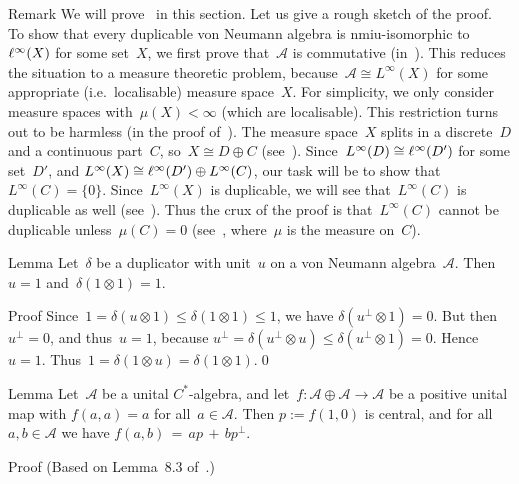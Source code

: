 \documentclass[a]{subfiles}
\begin{document}
\begin{parsec}
\begin{point}{Remark}
\label{sec:characterisation-dup-vna}
We will prove~ in this section.
Let us give
a rough sketch of the proof.
To show that every duplicable von Neumann algebra
is nmiu-isomorphic to~$\ell^\infty(X)$ for some set~$X$,
we first prove that~$\mathscr{A}$
is commutative (in~).
This reduces the situation
to a measure theoretic problem,
because~$\mathscr{A} \cong L^\infty(X)$
for some appropriate (i.e.~localisable) measure space~$X$.
For simplicity,
we only consider
measure spaces with~$\mu(X)<\infty$
(which are localisable).
This restriction turns out to be harmless
(in the proof of~).
The measure space~$X$ splits
in a discrete~$D$ and a continuous part~$C$,
so~$X\cong D\oplus C$
(see~).
Since~$L^\infty(D)\cong \ell^\infty(D')$
for some set~$D'$,
and $L^\infty(X)\cong \ell^\infty(D')\oplus L^\infty(C)$,
our task will be  to show that~$L^\infty(C)=\{0\}$.
Since~$L^\infty(X)$ is duplicable,
we will see that~$L^\infty(C)$ is duplicable as well
(see~).
Thus the crux of the proof is that~$L^\infty(C)$
cannot be duplicable unless~$\mu(C)=0$
(see~,
where~$\mu$ is the measure on~$C$).
\end{point}
\begin{point}{Lemma}%
\label{lem:unit-duplicator}
Let~$\delta$
be a duplicator 
with unit~$u$
on a von Neumann algebra~$\mathscr{A}$.
Then~$u=1$ and~$\delta(1\otimes 1)=1$.
\begin{point}{Proof}%
Since~$1=\delta(u\otimes 1)\leq \delta(1\otimes 1) \leq 1$,
we have $\delta(u^\perp\otimes 1)=0$.
But then~$u^\perp=0$, and thus~$u=1$,
because  $u^\perp = \delta(u^\perp \otimes u)
\leq \delta(u^\perp \otimes 1) = 0$.
Hence~$u=1$.
Thus~$1=\delta(1\otimes u)=\delta(1\otimes 1)$.\qed
\end{point}
\end{point}
\begin{point}{Lemma}%
Let~$\mathscr{A}$ be a unital $C^*$-algebra,
and let~$f\colon \mathscr{A}\oplus\mathscr{A}\to \mathscr{A}$
be a positive unital map 
with $f(a,a)=a$ for all~$a\in \mathscr{A}$.
Then $p:=f(1,0)$ is central,
and
for all~$a,b\in\mathscr{A}$
	we have
$f(a,b) \,=\, ap\,+\, bp^\perp$.
\begin{point}{Proof}%
(Based on Lemma~8.3 of~\cite{ndlmcs}.)


\end{point}
\end{point}
\end{parsec}
\end{document}
